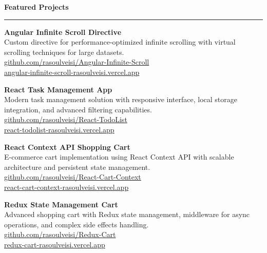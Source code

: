 \documentclass[a4paper,10pt]{article}
\newcommand{\sectionheader}[1]{\vspace{4pt}\textbf{\large\color{headercolor}#1}\vspace{1pt}\hrule\vspace{2pt}}
\newcommand{\projecttitle}[1]{\textbf{#1}}
\begin{document}
\sectionheader{Featured Projects}
\begin{multicols}{2}

\projecttitle{Angular Infinite Scroll Directive} \\
Custom directive for performance-optimized infinite scrolling with virtual scrolling techniques for large datasets. \\
\href{https://github.com/rasoulveisi/Angular-Infinite-Scroll}{\footnotesize github.com/rasoulveisi/Angular-Infinite-Scroll} \\
\href{https://angular-infinite-scroll-rasoulveisi.vercel.app/}{\footnotesize angular-infinite-scroll-rasoulveisi.vercel.app}

\vspace{2pt}
\projecttitle{React Task Management App} \\
Modern task management solution with responsive interface, local storage integration, and advanced filtering capabilities. \\
\href{https://github.com/rasoulveisi/React-TodoList}{\footnotesize github.com/rasoulveisi/React-TodoList} \\
\href{https://react-todolist-rasoulveisi.vercel.app/}{\footnotesize react-todolist-rasoulveisi.vercel.app}

\columnbreak

\projecttitle{React Context API Shopping Cart} \\
E-commerce cart implementation using React Context API with scalable architecture and persistent state management. \\
\href{https://github.com/rasoulveisi/React-Cart-Context}{\footnotesize github.com/rasoulveisi/React-Cart-Context} \\
\href{https://react-cart-context-rasoulveisi.vercel.app/}{\footnotesize react-cart-context-rasoulveisi.vercel.app}

\vspace{2pt}
\projecttitle{Redux State Management Cart} \\
Advanced shopping cart with Redux state management, middleware for async operations, and complex side effects handling. \\
\href{https://github.com/rasoulveisi/Redux-Cart}{\footnotesize github.com/rasoulveisi/Redux-Cart} \\
\href{https://redux-cart-rasoulveisi.vercel.app/}{\footnotesize redux-cart-rasoulveisi.vercel.app}

\end{multicols}
\end{document}
